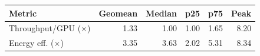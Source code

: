 \begin{tabular}{lrrrrr}
\toprule
Metric & Geomean & Median & p25 & p75 & Peak\\
\midrule
Throughput/GPU ($\times$) & 1.33 & 1.00 & 1.00 & 1.65 & 8.20\\
Energy eff. ($\times$) & 3.35 & 3.63 & 2.02 & 5.31 & 8.34\\
\bottomrule
\end{tabular}
